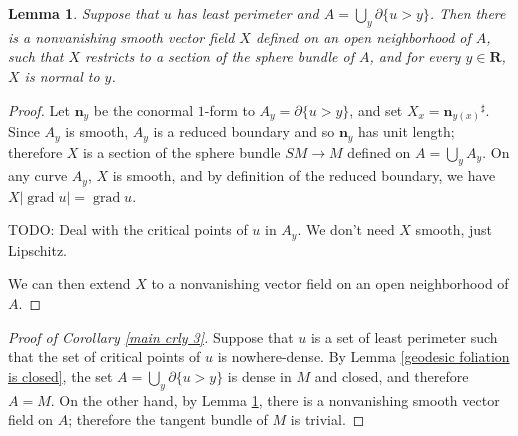 \documentclass[reqno,12pt,letterpaper]{amsart}
\newcommand{\RR}{\mathbf{R}}
\DeclareMathOperator{\grad}{grad}
\newcommand{\normal}{\mathbf n}
\newtheorem{lemma}[theorem]{Lemma}
\theoremstyle{definition}
\numberwithin{equation}{section}
\begin{document}
\begin{lemma}\label{existence of normal field}
Suppose that $u$ has least perimeter and $A = \bigcup_y \partial \{u > y\}$.
Then there is a nonvanishing smooth vector field $X$ defined on an open neighborhood of $A$, such that $X$ restricts to a section of the sphere bundle of $A$, and for every $y \in \RR$, $X$ is normal to $y$.
\end{lemma}
\begin{proof}
Let $\normal_y$ be the conormal $1$-form to $A_y = \partial \{u > y\}$, and set $X_x = {\normal_{y(x)}}^\sharp$.
Since $A_y$ is smooth, $A_y$ is a reduced boundary and so $\normal_y$ has unit length; therefore $X$ is a section of the sphere bundle $SM \to M$ defined on $A = \bigcup_y A_y$.
On any curve $A_y$, $X$ is smooth, and by definition of the reduced boundary, we have $X|\grad u| = \grad u$.

TODO: Deal with the critical points of $u$ in $A_y$. We don't need $X$ smooth, just Lipschitz.

We can then extend $X$ to a nonvanishing vector field on an open neighborhood of $A$.
\end{proof}

\begin{proof}[Proof of Corollary \ref{main crly 3}]
Suppose that $u$ is a set of least perimeter such that the set of critical points of $u$ is nowhere-dense.
By Lemma \ref{geodesic foliation is closed}, the set $A = \bigcup_y \partial \{u > y\}$ is dense in $M$ and closed, and therefore $A = M$.
On the other hand, by Lemma \ref{existence of normal field}, there is a nonvanishing smooth vector field on $A$; therefore the tangent bundle of $M$ is trivial.
\end{proof}
\end{document}
